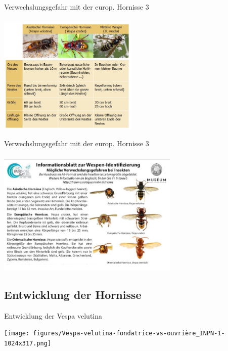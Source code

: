 \documentclass[aspectratio=169]{beamer}
\begin{document}
\begin{frame}{Verwechslungsgefahr mit der europ. Hornisse 3}
	\framesubtitle{} 
	\begin{center}	
		\includegraphics[width=0.5\textwidth]{figures/Vergleich.JPG}
	\end{center}
	\end{frame}

	
\begin{frame}{Verwechslungsgefahr mit der europ. Hornisse 3}
	\framesubtitle{} 
	\begin{center}	
		\includegraphics[width=0.65\textwidth]{figures/verwechselung.JPG}
	\end{center}
	\end{frame}


\subsection[Entwicklung]{Entwicklung der Hornisse}

\begin{frame}{Entwicklung der Vespa velutina}

	\begin{center}	
		\texttt{[image: figures/Vespa-velutina-fondatrice-vs-ouvrière\_INPN-1-1024x317.png]}
	\end{center}

	\end{frame}
\end{document}
